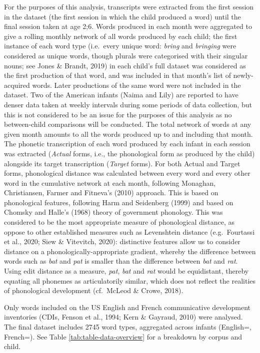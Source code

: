\documentclass[
  english,
  man,floatsintext]{apa6}
\begin{document}
For the purposes of this analysis, transcripts were extracted from the first session in the dataset (the first session in which the child produced a word) until the final session taken at age 2;6. Words produced in each month were aggregated to give a rolling monthly network of all words produced by each child; the first instance of each word type (i.e.~every unique word: \emph{bring} and \emph{bringing} were considered as unique words, though plurals were categorised with their singular nouns; see Jones \& Brandt, 2019) in each child's full dataset was considered as the first production of that word, and was included in that month's list of newly-acquired words. Later productions of the same word were not included in the dataset. Two of the American infants (Naima and Lily) are reported to have denser data taken at weekly intervals during some periods of data collection, but this is not considered to be an issue for the purposes of this analysis as no between-child comparisons will be conducted. The total network of words at any given month amounts to all the words produced up to and including that month. The phonetic transcription of each word produced by each infant in each session was extracted (\emph{Actual} forms, i.e., the phonological form as produced by the child) alongside its target transcription (\emph{Target} forms). For both Actual and Target forms, phonological distance was calculated between every word and every other word in the cumulative network at each month, following Monaghan, Christiansen, Farmer and Fitneva's (2010) approach. This is based on phonological features, following Harm and Seidenberg (1999) and based on Chomsky and Halle's (1968) theory of government phonology. This was considered to be the most appropriate measure of phonological distance, as oppose to other established measures such as Levenshtein distance (e.g.~Fourtassi et al., 2020; Siew \& Vitevitch, 2020): distinctive features allow us to consider distance on a phonologically-appropriate gradient, whereby the difference between words such as \emph{bat} and \emph{pat} is smaller than the difference between \emph{bat} and \emph{rat}. Using edit distance as a measure, \emph{pat}, \emph{bat} and \emph{rat} would be equidistant, thereby equating all phonemes as articulatorily similar, which does not reflect the realities of phonological development (cf.~McLeod \& Crowe, 2018).

Only words included on the US English and French communicative development inventories (CDIs, Fenson et al., 1994; Kern \& Gayraud, 2010) were analysed. The final dataset includes 2745 word types, aggregated across infants (English=, French=). See Table \ref{tab:table-data-overview} for a breakdown by corpus and child.
\end{document}
